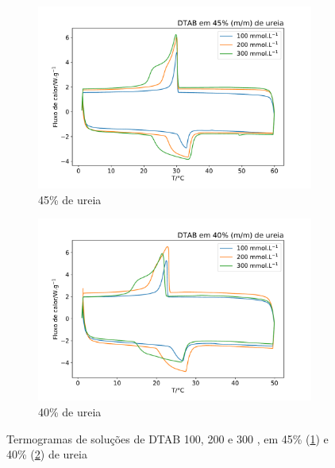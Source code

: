 		\begin{figure}[H]
			\centering
			\begin{subfigure}[t]{0.45\textwidth}
				\includegraphics[width=\textwidth]{./imagens/dsc/DTAB_45p}
				\caption{45\% de ureia}
				\label{fig:DSC_DTAB_UR45}
			\end{subfigure} \qquad %
			\begin{subfigure}[t]{0.45\textwidth}
				\includegraphics[width=\textwidth]{./imagens/dsc/DTAB_40p}
				\caption{40\% de ureia}
				\label{fig:DSC_DTAB_UR40}
			\end{subfigure}
			\caption{Termogramas de soluções de DTAB 100, 200 e 300 \mM{}, em 45\% (\ref{fig:DSC_DTAB_UR45}) e 40\% (\ref{fig:DSC_DTAB_UR40}) de ureia}
			\label{fig:DSC_DTAB_UR_40-45}
		\end{figure}
		
